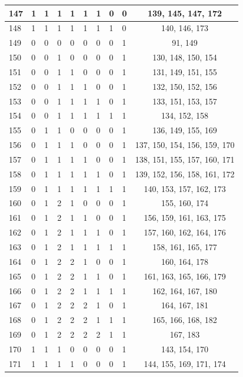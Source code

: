 \begin{longtable}{|l|l|l|l|l|l|l|l|l|c|}
147 & 1 & 1 & 1 & 1 & 1 & 1 & 0 & 0 & 139, 145, 147, 172 \\ \hline
148 & 1 & 1 & 1 & 1 & 1 & 1 & 1 & 0 & 140, 146, 173 \\ \hline
149 & 0 & 0 & 0 & 0 & 0 & 0 & 0 & 1 & 91, 149 \\ \hline
150 & 0 & 0 & 1 & 0 & 0 & 0 & 0 & 1 & 130, 148, 150, 154 \\ \hline
151 & 0 & 0 & 1 & 1 & 0 & 0 & 0 & 1 & 131, 149, 151, 155 \\ \hline
152 & 0 & 0 & 1 & 1 & 1 & 0 & 0 & 1 & 132, 150, 152, 156 \\ \hline
153 & 0 & 0 & 1 & 1 & 1 & 1 & 0 & 1 & 133, 151, 153, 157 \\ \hline
154 & 0 & 0 & 1 & 1 & 1 & 1 & 1 & 1 & 134, 152, 158 \\ \hline
155 & 0 & 1 & 1 & 0 & 0 & 0 & 0 & 1 & 136, 149, 155, 169 \\ \hline
156 & 0 & 1 & 1 & 1 & 0 & 0 & 0 & 1 & 137, 150, 154, 156, 159, 170 \\ \hline
157 & 0 & 1 & 1 & 1 & 1 & 0 & 0 & 1 & 138, 151, 155, 157, 160, 171 \\ \hline
158 & 0 & 1 & 1 & 1 & 1 & 1 & 0 & 1 & 139, 152, 156, 158, 161, 172 \\ \hline
159 & 0 & 1 & 1 & 1 & 1 & 1 & 1 & 1 & 140, 153, 157, 162, 173 \\ \hline
160 & 0 & 1 & 2 & 1 & 0 & 0 & 0 & 1 & 155, 160, 174 \\ \hline
161 & 0 & 1 & 2 & 1 & 1 & 0 & 0 & 1 & 156, 159, 161, 163, 175 \\ \hline
162 & 0 & 1 & 2 & 1 & 1 & 1 & 0 & 1 & 157, 160, 162, 164, 176 \\ \hline
163 & 0 & 1 & 2 & 1 & 1 & 1 & 1 & 1 & 158, 161, 165, 177 \\ \hline
164 & 0 & 1 & 2 & 2 & 1 & 0 & 0 & 1 & 160, 164, 178 \\ \hline
165 & 0 & 1 & 2 & 2 & 1 & 1 & 0 & 1 & 161, 163, 165, 166, 179 \\ \hline
166 & 0 & 1 & 2 & 2 & 1 & 1 & 1 & 1 & 162, 164, 167, 180 \\ \hline
167 & 0 & 1 & 2 & 2 & 2 & 1 & 0 & 1 & 164, 167, 181 \\ \hline
168 & 0 & 1 & 2 & 2 & 2 & 1 & 1 & 1 & 165, 166, 168, 182 \\ \hline
169 & 0 & 1 & 2 & 2 & 2 & 2 & 1 & 1 & 167, 183 \\ \hline
170 & 1 & 1 & 1 & 0 & 0 & 0 & 0 & 1 & 143, 154, 170 \\ \hline
171 & 1 & 1 & 1 & 1 & 0 & 0 & 0 & 1 & 144, 155, 169, 171, 174 \\ \hline

\end{longtable}
